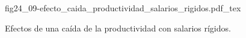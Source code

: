 \begin{figure}[h]
\centering
\def\svgwidth{0.9\textwidth}
{fig24_09-efecto_caida_productividad_salarios_rigidos.pdf_tex}
\caption{Efectos de una caída de la productividad con salarios rígidos.}
\label{fig24_09-efecto_caida_productividad_salarios_rigidos}
\end{figure}